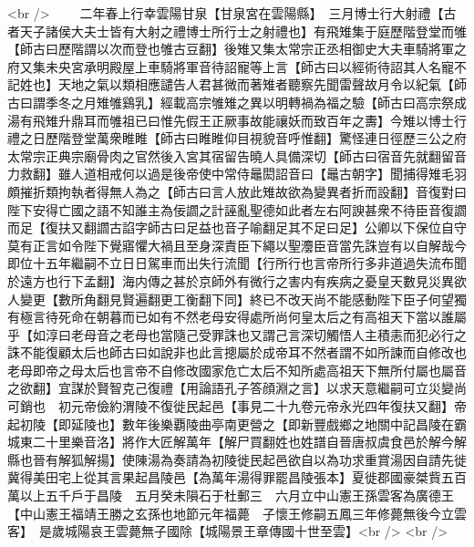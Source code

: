 <br />
　　二年春上行幸雲陽甘泉【甘泉宮在雲陽縣】　三月博士行大射禮【古者天子諸侯大夫士皆有大射之禮博士所行士之射禮也】有飛雉集于庭歷階登堂而雊【師古曰歷階謂以次而登也雊古豆翻】後雉又集太常宗正丞相御史大夫車騎將軍之府又集未央宮承明殿屋上車騎將軍音待詔寵等上言【師古曰以經術待詔其人名寵不記姓也】天地之氣以類相應譴告人君甚微而著雉者聽察先聞雷聲故月令以紀氣【師古曰謂季冬之月雉雊鷄乳】經載高宗雊雉之異以明轉禍為福之驗【師古曰高宗祭成湯有飛雉升鼎耳而雊祖已曰惟先假王正厥事故能禳妖而致百年之夀】今雉以博士行禮之日歷階登堂萬衆睢睢【師古曰睢睢仰目視貌音呼惟翻】驚怪連日徑歷三公之府太常宗正典宗廟骨肉之官然後入宮其宿留告曉人具備深切【師古曰宿音先就翻留音力救翻】雖人道相戒何以過是後帝使中常侍鼂閎詔音曰【鼂古朝字】聞捕得雉毛羽頗摧折類拘執者得無人為之【師古曰言人放此雉故欲為變異者折而設翻】音復對曰陛下安得亡國之語不知誰主為佞讇之計誣亂聖德如此者左右阿諛甚衆不待臣音復讇而足【復扶又翻讇古諂字師古曰足益也音子喻翻足其不足曰足】公卿以下保位自守莫有正言如令陛下覺寤懼大禍且至身深責臣下繩以聖灋臣音當先誅豈有以自解哉今即位十五年繼嗣不立日日駕車而出失行流聞【行所行也言帝所行多非道過失流布聞於遠方也行下孟翻】海内傳之甚於京師外有微行之害内有疾病之憂皇天數見災異欲人變更【數所角翻見賢遍翻更工衡翻下同】終已不改天尚不能感動陛下臣子何望獨有極言待死命在朝暮而已如有不然老母安得處所尚何皇太后之有高祖天下當以誰屬乎【如淳曰老母音之老母也當隨己受罪誅也又謂己言深切觸悟人主積恚而犯必行之誅不能復顧太后也師古曰如說非也此言摠屬於成帝耳不然者謂不如所諫而自修改也老母即帝之母太后也言帝不自修改國家危亡太后不知所處高祖天下無所付屬也屬音之欲翻】宜謀於賢智克己復禮【用論語孔子答顔淵之言】以求天意繼嗣可立災變尚可銷也　初元帝儉約渭陵不復徙民起邑【事見二十九卷元帝永光四年復扶又翻】帝起初陵【即延陵也】數年後樂覇陵曲亭南更營之【即新豐戲鄉之地關中記昌陵在霸城東二十里樂音洛】將作大匠解萬年【解尸買翻姓也姓譜自晉唐叔虞食邑於解今解縣也晉有解狐解揚】使陳湯為奏請為初陵徙民起邑欲自以為功求重賞湯因自請先徙冀得美田宅上從其言果起昌陵邑【為萬年湯得罪罷昌陵張本】夏徙郡國豪桀貲五百萬以上五千戶于昌陵　五月癸未隕石于杜郵三　六月立中山憲王孫雲客為廣德王【中山憲王福靖王勝之玄孫也地節元年福薨　子懷王修嗣五鳳三年修薨無後今立雲客】　是歲城陽哀王雲薨無子國除【城陽景王章傳國十世至雲】<br />
<br />
